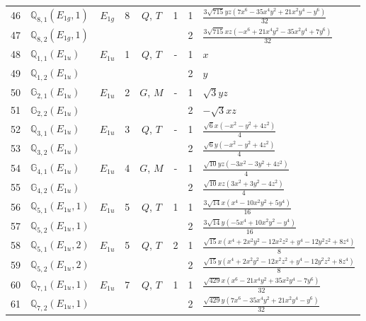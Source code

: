 \documentclass[fleqn,10pt,landscape]{jsarticle}
\begin{document}
\begin{longtable}[l]{clcccccl}
46 & $\mathbb{Q}_{8,1}(E_{1g},1)$ & $E_{1g}$ & 8 & $Q$, $T$ & 1 & 1 & $\frac{3 \sqrt{715} y z \left(7 x^{6} - 35 x^{4} y^{2} + 21 x^{2} y^{4} - y^{6}\right)}{32}$ \\
47 & $\mathbb{Q}_{8,2}(E_{1g},1)$ &  &  &  &  & 2 & $\frac{3 \sqrt{715} x z \left(- x^{6} + 21 x^{4} y^{2} - 35 x^{2} y^{4} + 7 y^{6}\right)}{32}$ \\ \hline
48 & $\mathbb{Q}_{1,1}(E_{1u})$ & $E_{1u}$ & 1 & $Q$, $T$ & - & 1 & $x$ \\
49 & $\mathbb{Q}_{1,2}(E_{1u})$ &  &  &  &  & 2 & $y$ \\ \hline
50 & $\mathbb{G}_{2,1}(E_{1u})$ & $E_{1u}$ & 2 & $G$, $M$ & - & 1 & $\sqrt{3} y z$ \\
51 & $\mathbb{G}_{2,2}(E_{1u})$ &  &  &  &  & 2 & $- \sqrt{3} x z$ \\ \hline
52 & $\mathbb{Q}_{3,1}(E_{1u})$ & $E_{1u}$ & 3 & $Q$, $T$ & - & 1 & $\frac{\sqrt{6} x \left(- x^{2} - y^{2} + 4 z^{2}\right)}{4}$ \\
53 & $\mathbb{Q}_{3,2}(E_{1u})$ &  &  &  &  & 2 & $\frac{\sqrt{6} y \left(- x^{2} - y^{2} + 4 z^{2}\right)}{4}$ \\ \hline
54 & $\mathbb{G}_{4,1}(E_{1u})$ & $E_{1u}$ & 4 & $G$, $M$ & - & 1 & $\frac{\sqrt{10} y z \left(- 3 x^{2} - 3 y^{2} + 4 z^{2}\right)}{4}$ \\
55 & $\mathbb{G}_{4,2}(E_{1u})$ &  &  &  &  & 2 & $\frac{\sqrt{10} x z \left(3 x^{2} + 3 y^{2} - 4 z^{2}\right)}{4}$ \\ \hline
56 & $\mathbb{Q}_{5,1}(E_{1u},1)$ & $E_{1u}$ & 5 & $Q$, $T$ & 1 & 1 & $\frac{3 \sqrt{14} x \left(x^{4} - 10 x^{2} y^{2} + 5 y^{4}\right)}{16}$ \\
57 & $\mathbb{Q}_{5,2}(E_{1u},1)$ &  &  &  &  & 2 & $\frac{3 \sqrt{14} y \left(- 5 x^{4} + 10 x^{2} y^{2} - y^{4}\right)}{16}$ \\ \hline
58 & $\mathbb{Q}_{5,1}(E_{1u},2)$ & $E_{1u}$ & 5 & $Q$, $T$ & 2 & 1 & $\frac{\sqrt{15} x \left(x^{4} + 2 x^{2} y^{2} - 12 x^{2} z^{2} + y^{4} - 12 y^{2} z^{2} + 8 z^{4}\right)}{8}$ \\
59 & $\mathbb{Q}_{5,2}(E_{1u},2)$ &  &  &  &  & 2 & $\frac{\sqrt{15} y \left(x^{4} + 2 x^{2} y^{2} - 12 x^{2} z^{2} + y^{4} - 12 y^{2} z^{2} + 8 z^{4}\right)}{8}$ \\ \hline
60 & $\mathbb{Q}_{7,1}(E_{1u},1)$ & $E_{1u}$ & 7 & $Q$, $T$ & 1 & 1 & $\frac{\sqrt{429} x \left(x^{6} - 21 x^{4} y^{2} + 35 x^{2} y^{4} - 7 y^{6}\right)}{32}$ \\
61 & $\mathbb{Q}_{7,2}(E_{1u},1)$ &  &  &  &  & 2 & $\frac{\sqrt{429} y \left(7 x^{6} - 35 x^{4} y^{2} + 21 x^{2} y^{4} - y^{6}\right)}{32}$ \\ \hline

\end{longtable}
\end{document}
